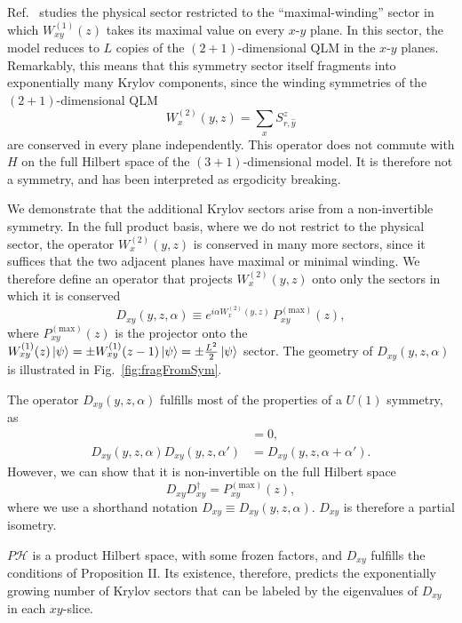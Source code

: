 \documentclass[
 reprint,
 amsmath,amssymb,
 aps,floatfix,prl,superscriptaddress
]{revtex4-2}
\begin{document}
Ref.~\cite{Steinegger2025} studies the physical sector restricted to the ``maximal-winding'' sector in which $W^{(1)}_{xy}(z)$ takes its maximal value on every $x$-$y$ plane. In this sector, the model reduces to $L$ copies of the $(2+1)$-dimensional QLM in the $x$-$y$ planes. Remarkably, this means that this symmetry sector itself fragments into exponentially many Krylov components, since the winding symmetries of the $(2+1)$-dimensional QLM
\begin{equation}
    W^{(2)}_{x}(y,z) = \sum_{x } S^z_{r,\hat{y}}
\end{equation}
are conserved in every plane independently.
This operator does not commute with $H$ on the full Hilbert space of the $(3+1)$-dimensional model. It is therefore not a symmetry, and has been interpreted as ergodicity breaking. 

We demonstrate that the additional Krylov sectors arise from a non-invertible symmetry. 
In the full product basis, where we do not restrict to the physical sector, the operator $ W^{(2)}_{x}(y,z)$ is conserved in many more sectors, since it suffices that the two adjacent planes have maximal or minimal winding. We therefore define an operator that projects $W^{(2)}_{x}(y,z)$ onto only the sectors in which it is conserved
\begin{equation}\label{eq:noninvertible}
D_{xy}(y,z, \alpha) \equiv e^{i \alpha W^{(2)}_{x}(y,z)} \, P_{xy}^{(\mathrm{max})}(z),
\end{equation} 
where $P_{xy}^{(\mathrm{max})}(z)$ is the projector onto the $W^{(1)}_{xy}(z) \ket{\psi} = \pm W^{(1)}_{xy}(z - 1) \ket{\psi} = \pm \frac{L^2}{2} \ket{\psi}$ sector. The geometry of $D_{xy}(y,z, \alpha)$ is illustrated in Fig.~\ref{fig:fragFromSym}.

The operator $D_{xy}(y,z, \alpha)$ fulfills most of the properties of a $U(1)$ symmetry, as
\begin{align}
    [H,D_{xy}(y,z, \alpha)] &=0, \\ 
    D_{xy}(y,z, \alpha) D_{xy}(y,z, \alpha') &= D_{xy}(y,z, \alpha + \alpha').
\end{align}
However, we can show that it is non-invertible on the full Hilbert space
\begin{equation}
    D_{xy} D_{xy}^\dagger = P_{xy}^{(\mathrm{max})}(z),
\end{equation}
where we use a shorthand notation $D_{xy} \equiv D_{xy}(y,z, \alpha)$. $D_{xy}$ is therefore a partial isometry. 

$P\mathcal{H}$ is a product Hilbert space, with some frozen factors, and $D_{xy}$ fulfills the conditions of Proposition II. Its existence, therefore, predicts the exponentially growing number of Krylov sectors that can be labeled by the eigenvalues of $D_{xy}$ in each $xy$-slice.
\end{document}
